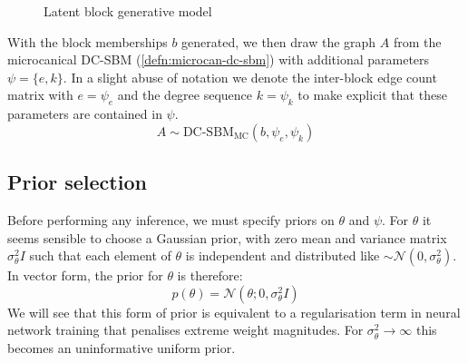 \documentclass{article}
\newcommand{\Gaussian}{\mathcal{N}}
\begin{document}
\begin{figure}[!h]
	\centering
	\caption{Latent block generative model}
	\label{fig:lbgm}
\end{figure}

With the block memberships $b$ generated, we then draw the graph $A$ from the microcanical DC-SBM (\ref{defn:microcan-dc-sbm}) with additional parameters $\psi = \{e, k\}$. In a slight abuse of notation we denote the inter-block edge count matrix with $e = \psi_e$ and the degree sequence $k = \psi_k$ to make explicit that these parameters are contained in $\psi$.
%
\begin{equation}
	A \sim \textrm{DC-SBM}_{\textrm{MC}} (b, \psi_e, \psi_k)
\end{equation}


\subsection{Prior selection}

Before performing any inference, we must specify priors on $\theta$ and $\psi$. For $\theta$ it seems sensible to choose a Gaussian prior, with zero mean and variance matrix $\sigma^2_\theta I$ such that each element of $\theta$ is independent and distributed like $\sim \Gaussian(0, \sigma_\theta^2)$. In vector form, the prior for $\theta$ is therefore:
%
\begin{equation}
	p(\theta) = \Gaussian \left( \theta ; 0, \sigma_\theta^2 I \right)
	\label{eqn:theta-prior}
\end{equation}
%
We will see that this form of prior is equivalent to a regularisation term in neural network training that penalises extreme weight magnitudes. For $\sigma_\theta^2 \rightarrow \infty$ this becomes an uninformative uniform prior.
\end{document}
